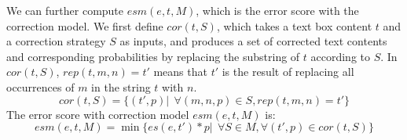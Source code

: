 We can further compute $esm(e, t, M)$,
which is the error score with the correction model. 
We first define $cor(t, S)$, 
which takes a text box content $t$ and a correction strategy $S$ as inputs, 
and produces a set of corrected text contents and 
corresponding probabilities by replacing the substring of $t$ 
according to $S$. In $cor(t, S)$, $rep(t, m, n)=t'$ means that $t'$ is the 
result of replacing all occurrences of $m$ in the string $t$ with $n$. 
\begin{equation}
cor(t, S)=\{(t',p)|~~\forall (m,n,p) \in S, rep(t,m,n)=t'\}
\end{equation}
The error score with correction model $esm(e, t, M)$ is: 
\begin{equation}
esm(e, t, M)= \min\{es(e, t')*p | ~~\forall S \in M, \forall (t', p) \in cor(t, S)\}
\end{equation}


